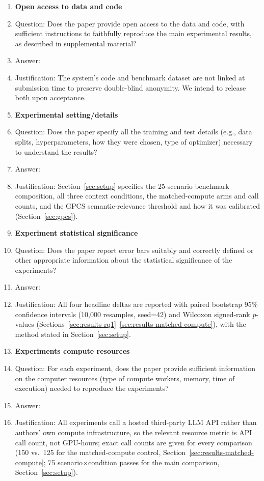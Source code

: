 \begin{enumerate}
\item {\bf Open access to data and code}
    \item[] Question: Does the paper provide open access to the data and code, with sufficient instructions to faithfully reproduce the main experimental results, as described in supplemental material?
    \item[] Answer: \answerNo{}
    \item[] Justification: The system's code and benchmark dataset are not linked at submission time to preserve double-blind anonymity. We intend to release both upon acceptance.

\item {\bf Experimental setting/details}
    \item[] Question: Does the paper specify all the training and test details (e.g., data splits, hyperparameters, how they were chosen, type of optimizer) necessary to understand the results?
    \item[] Answer: \answerYes{}
    \item[] Justification: Section~\ref{sec:setup} specifies the 25-scenario benchmark composition, all three context conditions, the matched-compute arms and call counts, and the GPCS semantic-relevance threshold and how it was calibrated (Section~\ref{sec:gpcs}).

\item {\bf Experiment statistical significance}
    \item[] Question: Does the paper report error bars suitably and correctly defined or other appropriate information about the statistical significance of the experiments?
    \item[] Answer: \answerYes{}
    \item[] Justification: All four headline deltas are reported with paired bootstrap 95\% confidence intervals (10{,}000 resamples, seed=42) and Wilcoxon signed-rank $p$-values (Sections~\ref{sec:results-rq1}--\ref{sec:results-matched-compute}), with the method stated in Section~\ref{sec:setup}.

\item {\bf Experiments compute resources}
    \item[] Question: For each experiment, does the paper provide sufficient information on the computer resources (type of compute workers, memory, time of execution) needed to reproduce the experiments?
    \item[] Answer: \answerYes{}
    \item[] Justification: All experiments call a hosted third-party LLM API rather than authors' own compute infrastructure, so the relevant resource metric is API call count, not GPU-hours; exact call counts are given for every comparison (150 vs.\ 125 for the matched-compute control, Section~\ref{sec:results-matched-compute}; 75 scenario$\times$condition passes for the main comparison, Section~\ref{sec:setup}).


\end{enumerate}
